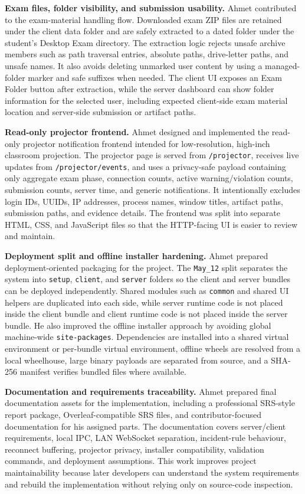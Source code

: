 \textbf{Exam files, folder visibility, and submission usability.} Ahmet contributed to the exam-material handling flow. Downloaded exam ZIP files are retained under the client data folder and are safely extracted to a dated folder under the student's Desktop Exam directory. The extraction logic rejects unsafe archive members such as path traversal entries, absolute paths, drive-letter paths, and unsafe names. It also avoids deleting unmarked user content by using a managed-folder marker and safe suffixes when needed. The client UI exposes an Exam Folder button after extraction, while the server dashboard can show folder information for the selected user, including expected client-side exam material location and server-side submission or artifact paths.

\textbf{Read-only projector frontend.} Ahmet designed and implemented the read-only projector notification frontend intended for low-resolution, high-inch classroom projection. The projector page is served from \texttt{/projector}, receives live updates from \texttt{/projector/events}, and uses a privacy-safe payload containing only aggregate exam phase, connection counts, active warning/violation counts, submission counts, server time, and generic notifications. It intentionally excludes login IDs, UUIDs, IP addresses, process names, window titles, artifact paths, submission paths, and evidence details. The frontend was split into separate HTML, CSS, and JavaScript files so that the HTTP-facing UI is easier to review and maintain.

\textbf{Deployment split and offline installer hardening.} Ahmet prepared deployment-oriented packaging for the project. The \texttt{May\_12} split separates the system into \texttt{setup}, \texttt{client}, and \texttt{server} folders so the client and server bundles can be deployed independently. Shared modules such as \texttt{common} and shared UI helpers are duplicated into each side, while server runtime code is not placed inside the client bundle and client runtime code is not placed inside the server bundle. He also improved the offline installer approach by avoiding global machine-wide \texttt{site-packages}. Dependencies are installed into a shared virtual environment or per-bundle virtual environment, offline wheels are resolved from a local wheelhouse, large binary payloads are separated from source, and a SHA-256 manifest verifies bundled files where available.

\textbf{Documentation and requirements traceability.} Ahmet prepared final documentation assets for the implementation, including a professional SRS-style report package, Overleaf-compatible SRS files, and contributor-focused documentation for his assigned parts. The documentation covers server/client requirements, local IPC, LAN WebSocket separation, incident-rule behaviour, reconnect buffering, projector privacy, installer compatibility, validation commands, and deployment assumptions. This work improves project maintainability because later developers can understand the system requirements and rebuild the implementation without relying only on source-code inspection.


